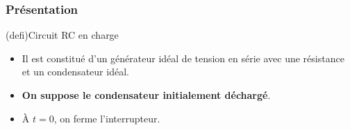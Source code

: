 \documentclass[../../main/main.tex]{subfiles}
\begin{document}
\subsubsection{Présentation}
\begin{tcb*}[sidebyside, righthand ratio=.30](defi){Circuit RC en charge}
	\begin{itemize}
		\item Il est constitué d'un générateur idéal de tension en série avec une
		      résistance et un condensateur idéal.
		\item \textbf{On suppose le condensateur initialement déchargé}.
		\item À $t=0$, on ferme l'interrupteur.
	\end{itemize}
	\tcblower
	\begin{center}
		\label{fig:circ_rc-start}
	\end{center}
\end{tcb*}
\end{document}
